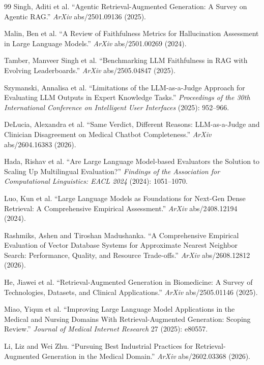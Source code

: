 \documentclass[12pt,a4paper]{article}
\begin{document}
{\begin{thebibliography}{99}
Singh, Aditi et al.
“Agentic Retrieval-Augmented Generation: A Survey on Agentic RAG.”
\emph{ArXiv} abs/2501.09136 (2025).

Malin, Ben et al.
“A Review of Faithfulness Metrics for Hallucination Assessment in Large Language Models.”
\emph{ArXiv} abs/2501.00269 (2024).

Tamber, Manveer Singh et al.
“Benchmarking LLM Faithfulness in RAG with Evolving Leaderboards.”
\emph{ArXiv} abs/2505.04847 (2025).

Szymanski, Annalisa et al.
“Limitations of the LLM-as-a-Judge Approach for Evaluating LLM Outputs in Expert Knowledge Tasks.”
\emph{Proceedings of the 30th International Conference on Intelligent User Interfaces} (2025): 952--966.

DeLucia, Alexandra et al.
“Same Verdict, Different Reasons: LLM-as-a-Judge and Clinician Disagreement on Medical Chatbot Completeness.”
\emph{ArXiv} abs/2604.16383 (2026).

Hada, Rishav et al.
“Are Large Language Model-based Evaluators the Solution to Scaling Up Multilingual Evaluation?”
\emph{Findings of the Association for Computational Linguistics: EACL 2024} (2024): 1051--1070.

Luo, Kun et al.
“Large Language Models as Foundations for Next-Gen Dense Retrieval: A Comprehensive Empirical Assessment.”
\emph{ArXiv} abs/2408.12194 (2024).

Rashmiks, Ashen and Tiroshan Madushanka.
“A Comprehensive Empirical Evaluation of Vector Database Systems for Approximate Nearest Neighbor Search: Performance, Quality, and Resource Trade-offs.”
\emph{ArXiv} abs/2608.12812 (2026).

He, Jiawei et al.
“Retrieval-Augmented Generation in Biomedicine: A Survey of Technologies, Datasets, and Clinical Applications.”
\emph{ArXiv} abs/2505.01146 (2025).

Miao, Yiqun et al.
“Improving Large Language Model Applications in the Medical and Nursing Domains With Retrieval-Augmented Generation: Scoping Review.”
\emph{Journal of Medical Internet Research} 27 (2025): e80557.

Li, Liz and Wei Zhu.
“Pursuing Best Industrial Practices for Retrieval-Augmented Generation in the Medical Domain.”
\emph{ArXiv} abs/2602.03368 (2026).


\end{thebibliography}}
\end{document}
